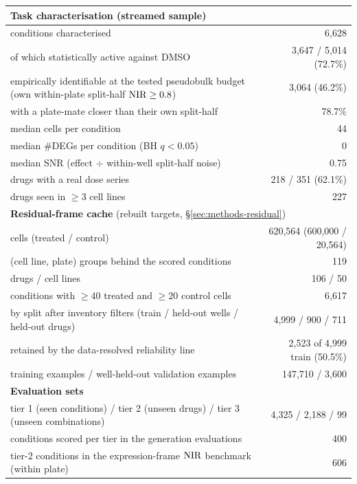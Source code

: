 \begin{table}[htbp]
\centering
\small
\begin{tabular}{p{}r}
\toprule
\multicolumn{2}{l}{\textbf{Task characterisation} (streamed sample)} \\
\midrule
conditions characterised & 6,628 \\
\quad of which statistically active against DMSO & 3,647 / 5,014 (72.7\%) \\
\quad empirically identifiable at the tested pseudobulk budget (own within-plate split-half $\textrm{NIR} \geq 0.8$) & 3,064 (46.2\%) \\
\quad with a plate-mate closer than their own split-half & 78.7\% \\
median cells per condition & 44 \\
median \#DEGs per condition (BH $q<0.05$) & 0 \\
median SNR (effect $\div$ within-well split-half noise) & 0.75 \\
drugs with a real dose series & 218 / 351 (62.1\%) \\
drugs seen in $\geq 3$ cell lines & 227 \\
\midrule
\multicolumn{2}{l}{\textbf{Residual-frame cache} (rebuilt targets, \S\ref{sec:methods-residual})} \\
\midrule
cells (treated / control) & 620,564 (600,000 / 20,564) \\
(cell line, plate) groups behind the scored conditions & 119 \\
drugs / cell lines & 106 / 50 \\
conditions with $\geq40$ treated and $\geq20$ control cells & 6,617 \\
\quad by split after inventory filters (train / held-out wells / held-out drugs) & 4,999 / 900 / 711 \\
\quad retained by the data-resolved reliability line & 2,523 of 4,999 train (50.5\%) \\
training examples / well-held-out validation examples & 147,710 / 3,600 \\
\midrule
\multicolumn{2}{l}{\textbf{Evaluation sets}} \\
\midrule
tier 1 (seen conditions) / tier 2 (unseen drugs) / tier 3 (unseen combinations) & 4,325 / 2,188 / 99 \\
conditions scored per tier in the generation evaluations & 400 \\
tier-2 conditions in the expression-frame $\textrm{NIR}$ benchmark (within plate) & 606 \\

\end{tabular}
\end{table}
